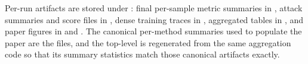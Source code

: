 \documentclass{article}
\begin{document}
Per-run artifacts are stored under : final per-sample metric summaries in , attack summaries and score files in , dense training traces in , aggregated tables in , and paper figures in  and . The canonical per-method summaries used to populate the paper are the  files, and the top-level  is regenerated from the same aggregation code so that its summary statistics match those canonical artifacts exactly.



\end{document}
